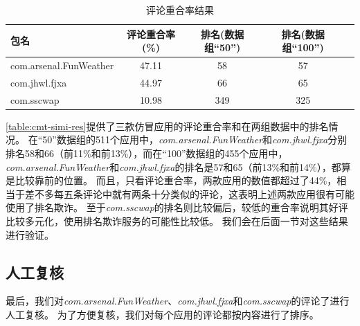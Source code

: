 \begin{table}[htbp]
	\renewcommand{\arraystretch}{1}
	\small
	\centering
	\caption{评论重合率结果}
	\vspace{1mm}
	\begin{tabular}{lcccc}
		\toprule
		包名 & 评论重合率(\%) & 排名(数据组``50'') & 排名(数据组``100'') \\
		\midrule
		com.arsenal.FunWeather & 47.11 & 58 & 57 \\
		\rowcolor{gray!15} com.jhwl.fjxa & 44.97 & 66 & 65 \\
		com.sscwap & 10.98 & 349 & 325 \\
		\bottomrule
	\end{tabular}
	\label{table:cmt-simi-res}
\end{table}

\autoref{table:cmt-simi-res}提供了三款仿冒应用的评论重合率和在两组数据中的排名情况。
在``50''数据组的511个应用中，\emph{com.arsenal.FunWeather}和\emph{com.jhwl.fjxa}分别排名58和66（前11\%和前13\%），而在``100''数据组的455个应用中，\emph{com.arsenal.FunWeather}和\emph{com.jhwl.fjxa}的排名是57和65（前13\%和前14\%），都算是比较靠前的位置。
而且，只看评论重合率，两款应用的数值都超过了44\%，相当于差不多每五条评论中就有两条十分类似的评论，这表明上述两款应用很有可能使用了排名欺诈。
至于\emph{com.sscwap}的排名则比较偏后，较低的重合率说明其好评比较多元化，使用排名欺诈服务的可能性比较低。
我们会在后面一节对这些结果进行验证。

\subsection{人工复核}

最后，我们对\emph{com.arsenal.FunWeather}、\emph{com.jhwl.fjxa}和\emph{com.sscwap}的评论了进行人工复核。
为了方便复核，我们对每个应用的评论都按内容进行了排序。


